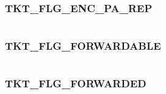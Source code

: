 \documentclass[letterpaper,10pt,english]{sphinxmanual}
\begin{document}
\subsubsection{TKT\_FLG\_ENC\_PA\_REP}
\label{appdev/refs/macros/TKT_FLG_ENC_PA_REP:tkt-flg-enc-pa-rep}\label{appdev/refs/macros/TKT_FLG_ENC_PA_REP:tkt-flg-enc-pa-rep-data}\label{appdev/refs/macros/TKT_FLG_ENC_PA_REP::doc}

\begin{fulllineitems}
\label{appdev/refs/macros/TKT_FLG_ENC_PA_REP:TKT_FLG_ENC_PA_REP}
\end{fulllineitems}


\begin{tabulary}{\linewidth}{|L|L|}
\hline

 & 
\\
\hline\end{tabulary}



\subsubsection{TKT\_FLG\_FORWARDABLE}
\label{appdev/refs/macros/TKT_FLG_FORWARDABLE:tkt-flg-forwardable-data}\label{appdev/refs/macros/TKT_FLG_FORWARDABLE:tkt-flg-forwardable}\label{appdev/refs/macros/TKT_FLG_FORWARDABLE::doc}

\begin{fulllineitems}
\label{appdev/refs/macros/TKT_FLG_FORWARDABLE:TKT_FLG_FORWARDABLE}
\end{fulllineitems}


\begin{tabulary}{\linewidth}{|L|L|}
\hline

 & 
\\
\hline\end{tabulary}



\subsubsection{TKT\_FLG\_FORWARDED}
\label{appdev/refs/macros/TKT_FLG_FORWARDED::doc}\label{appdev/refs/macros/TKT_FLG_FORWARDED:tkt-flg-forwarded}\label{appdev/refs/macros/TKT_FLG_FORWARDED:tkt-flg-forwarded-data}
\end{document}
